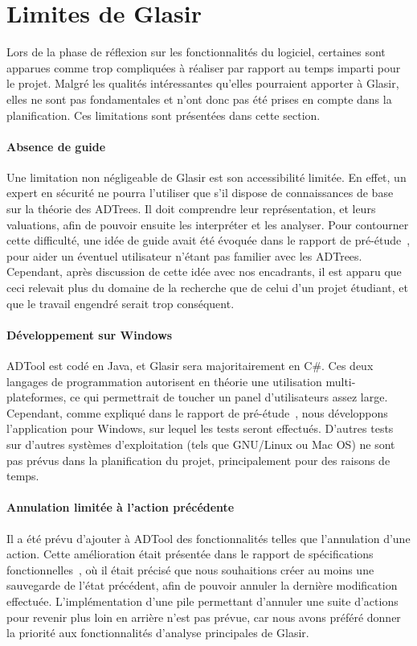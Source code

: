 \section{Limites de Glasir}
    \label{sec:limites}

    Lors de la phase de réflexion sur les fonctionnalités du logiciel, certaines sont apparues comme trop compliquées à réaliser par rapport au temps imparti pour le projet. Malgré les qualités intéressantes qu'elles pourraient apporter à Glasir, elles ne sont pas fondamentales et n'ont donc pas été prises en compte dans la planification. Ces limitations sont présentées dans cette section.

    \paragraph{Absence de guide}

    Une limitation non négligeable de Glasir est son accessibilité limitée. En effet, un expert en sécurité ne pourra l'utiliser que s'il dispose de connaissances de base sur la théorie des ADTrees. Il doit comprendre leur représentation, et leurs valuations, afin de pouvoir ensuite les interpréter et les analyser. Pour contourner cette difficulté, une idée de \og guide \fg{} avait été évoquée dans le rapport de pré-étude~\cite{pre_etude}, pour aider un éventuel utilisateur n'étant pas familier avec les ADTrees. Cependant, après discussion de cette idée avec nos encadrants, il est apparu que ceci relevait plus du domaine de la recherche que de celui d'un projet étudiant, et que le travail engendré serait trop conséquent.

    \paragraph{Développement sur Windows}

    ADTool est codé en Java, et Glasir sera majoritairement en C\#. Ces deux langages de programmation autorisent en théorie une utilisation multi-plateformes, ce qui permettrait de toucher un panel d'utilisateurs assez large. Cependant, comme expliqué dans le rapport de pré-étude~\cite{pre_etude}, nous développons l'application pour Windows, sur lequel les tests seront effectués. D'autres tests sur d'autres systèmes d'exploitation (tels que GNU/Linux ou Mac OS) ne sont pas prévus dans la planification du projet, principalement pour des raisons de temps.

    \paragraph{Annulation limitée à l'action précédente}

    Il a été prévu d'ajouter à ADTool des fonctionnalités telles que l'annulation d'une action. Cette amélioration était présentée dans le rapport de spécifications fonctionnelles~\cite{spec_fonc}, où il était précisé que nous souhaitions créer au moins une sauvegarde de l'état précédent, afin de pouvoir annuler la dernière modification effectuée. L'implémentation d'une pile permettant d'annuler une suite d'actions pour revenir plus loin en arrière n'est pas prévue, car nous avons préféré donner la priorité aux fonctionnalités d'analyse principales de Glasir.
